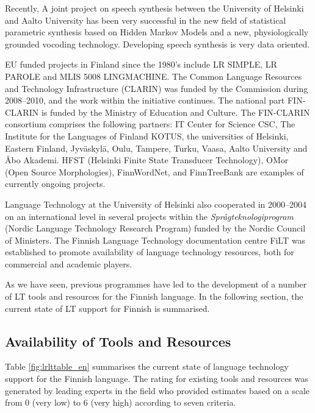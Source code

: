 \begin{multicols}{2}
Recently, A joint project on speech synthesis between the University of Helsinki and Aalto University has been very successful in the new field of statistical parametric synthesis based on Hidden Markov Models and a new, physiologically grounded vocoding technology. Developing speech synthesis is very data oriented.

EU funded projects in Finland since the 1980’s include LR SIMPLE, LR PAROLE and MLIS 5008 LINGMACHINE.  The Common Language Resources and Technology Infrastructure (CLARIN) was funded by the Commission during 2008--2010, and the work within the initiative continues. The national part FIN-CLARIN is funded by the Ministry of Education and Culture. The FIN-CLARIN consortium comprises the following partners: IT Center for Science CSC, The Institute for the Languages of Finland KOTUS, the universities of Helsinki, Eastern Finland, Jyväskylä, Oulu, Tampere, Turku, Vaasa, Aalto University and Åbo Akademi. HFST (Helsinki Finite State Transducer Technology), OMor (Open Source Morphologies), FinnWordNet, and FinnTreeBank are examples of currently ongoing projects.

Language Technology at the University of Helsinki also cooperated in 2000--2004 on an international level in several projects within the \textit{Språgteknologiprogram} (Nordic Language Technology Research Program) funded by the Nordic Council of Ministers. The Finnish Language Technology documentation centre FiLT was established to promote availability of language technology resources, both for commercial and academic players.

As we have seen, previous programmes have led to the development of a number of LT tools and resources for the Finnish language. In the following section, the current state of LT support for Finnish is summarised.

\subsection{Availability of Tools and Resources}

Table \ref{fig:lrlttable_en} summarises the current state of language
technology support for the Finnish language. The rating for existing
tools and resources was generated by leading experts in the field who
provided estimates based on a scale from 0 (very low) to 6 (very high)
according to seven criteria.


\end{multicols}
